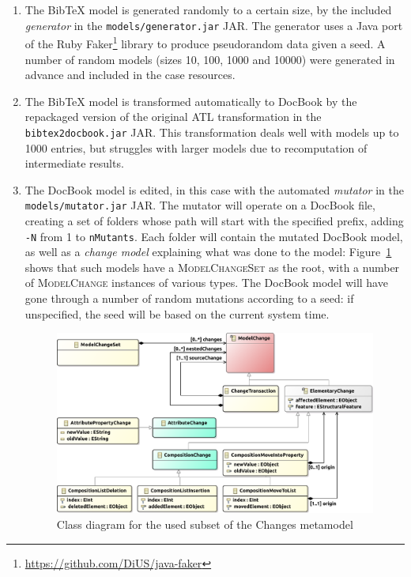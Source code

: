 \documentclass[a4paper]{article}
\newcommand*{\class}[1]{\textsc{#1}}
\newcommand*{\file}[1]{\texttt{#1}}
\begin{document}
\begin{enumerate}
\item The BibTeX model is generated randomly to a certain size, by the included
  \emph{generator} in the \file{models/generator.jar} JAR. The generator uses a
  Java port of the Ruby Faker\footnote{\url{https://github.com/DiUS/java-faker}}
  library to produce pseudorandom data given a seed. A number of random models
  (sizes 10, 100, 1000 and 10000) were generated in advance and included in the
  case resources.

\item The BibTeX model is transformed automatically to DocBook by the repackaged
  version of the original ATL transformation in the \file{bibtex2docbook.jar}
  JAR. This transformation deals well with models up to 1000 entries, but
  struggles with larger models due to recomputation of intermediate results.

\item The DocBook model is edited, in this case with the automated
  \emph{mutator} in the \file{models/mutator.jar} JAR. The mutator will operate
  on a DocBook file, creating a set of folders whose path will start with the
  specified prefix, adding \file{-N} from 1 to \file{nMutants}. Each folder will
  contain the mutated DocBook model, as well as a \emph{change model} explaining
  what was done to the model: Figure~\ref{fig:changes-mm} shows that such models
  have a \class{ModelChangeSet} as the root, with a number of
  \class{Model\-Change} instances of various types. The DocBook model will have
  gone through a number of random mutations according to a seed: if unspecified,
  the seed will be based on the current system time.

  \begin{figure}
    \centering
    \includegraphics[width=.8\textwidth,keepaspectratio]{simplified-changes}
    \caption{Class diagram for the used subset of the Changes metamodel}
    \label{fig:changes-mm}
  \end{figure}


\end{enumerate}
\end{document}
